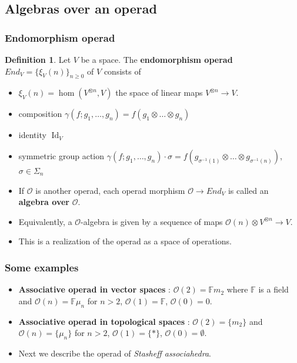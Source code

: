 \documentclass{beamer}
\theoremstyle{definition}
\newtheorem{defi}{Definition}
\begin{document}
\subsection{Algebras over an operad}
\begin{frame}
	\frametitle{Endomorphism operad}
	\begin{defi}
		Let $V$ be a space. The \textbf{endomorphism operad} $End_V = \{ \xi_V(n) \}_{n\geq 0}$ of $V$ consists of
		\begin{itemize}
			\item<1-> $\xi_V(n)=\hom(V^{\otimes n},V)
			$ the space of linear maps $V^{\otimes n} \to V$.
			\item<2-> composition $\gamma(f; g_1, \dots, g_n)= f(g_1\otimes\dots\otimes g_n)$
			\item<3-> identity $\operatorname{Id}_V$
			\item<4->  symmetric group action $\gamma (f; g_1, \dots, g_n) \cdot \sigma = f (g_{\sigma^{-1}(1)} \otimes \dots \otimes g_{\sigma^{-1}(n)})$,  $\sigma \in \Sigma_n$
		\end{itemize}
	\end{defi}
\end{frame}
\begin{frame}
\begin{itemize}
\item<1->
If $\mathcal{O}$ is another operad, each operad morphism $\mathcal{O} \to End_V$ is called an \textbf{algebra over} $\mathcal{O}$. 
\item<2->Equivalently, a $\mathcal{O}$-algebra is given by a sequence of maps $\mathcal{O}(n)\otimes V^{\otimes n}\to V$.
\item<3-> This is a realization of the operad as a space of operations.
\end{itemize}
\end{frame}

\begin{frame}
\frametitle{Some examples}
\begin{itemize}
\item<1-> \textbf{Associative operad in vector spaces} : $\mathcal{O}(2)=\mathbb{F} m_2$ where $\mathbb{F}$ is a field and $\mathcal{O}(n)=\mathbb{F}\mu_n$ for $n> 2$, $\mathcal{O}(1)=\mathbb{F}$, $\mathcal{O}(0)=0$.  %
\item<2->  \textbf{Associative operad in topological spaces} : $\mathcal{O}(2)=\{m_2\}$ and $\mathcal{O}(n)=\{\mu_n\}$ for $n> 2$, $\mathcal{O}(1)=\{*\}$, $\mathcal{O}(0)=\emptyset$. %

\item<3-> Next we describe the operad of \emph{Stasheff associahedra}.
\end{itemize}

\end{frame}
\end{document}
